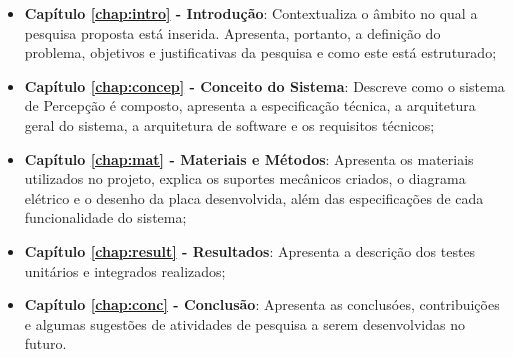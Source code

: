\begin{itemize}

  \item \textbf{Capítulo \ref{chap:intro} - Introdução}: Contextualiza o âmbito no qual a pesquisa proposta está inserida. Apresenta, portanto, a definição do problema, objetivos e justificativas da pesquisa e como este \thetypeworkthree está estruturado;

  \item \textbf{Capítulo \ref{chap:concep} - Conceito do Sistema}: Descreve como o sistema de Percepção é composto, apresenta a especificação técnica, a arquitetura geral do sistema, a arquitetura de software e os requisitos técnicos;
  
  \item \textbf{Capítulo \ref{chap:mat} - Materiais e Métodos}: Apresenta os materiais utilizados no projeto, explica os suportes mecânicos criados, o diagrama elétrico e o desenho da placa desenvolvida, além das especificações de cada funcionalidade do sistema;
  
  \item \textbf{Capítulo \ref{chap:result} - Resultados}: Apresenta a descrição dos testes unitários e integrados realizados;
 
  \item \textbf{Capítulo \ref{chap:conc} - Conclusão}: Apresenta as conclusóes, contribuições e algumas sugestões de atividades de pesquisa a serem desenvolvidas no futuro.

\end{itemize}

